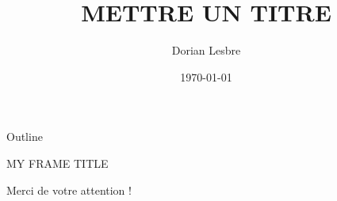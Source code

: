 \documentclass[14pt]{beamer}
\title{METTRE UN TITRE}
\author{Dorian Lesbre}
\date{\today}
\begin{document}
\begin{frame}
	\titlepage
\end{frame}

\begin{frame}{Outline}
	\tableofcontents
\end{frame}

\begin{frame}{MY FRAME TITLE}

\end{frame}


\begin{frame}
	\Large
	\begin{center}
		Merci de votre attention !
	\end{center}{}
\end{frame}
\end{document}
